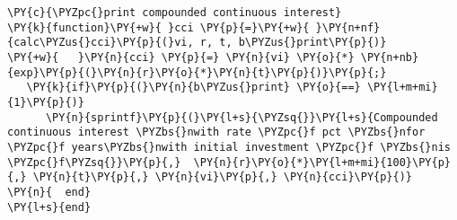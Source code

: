 \begin{Verbatim}[commandchars=\\\{\}]
\PY{c}{\PYZpc{}print compounded continuous interest}
\PY{k}{function}\PY{+w}{ }cci \PY{p}{=}\PY{+w}{ }\PY{n+nf}{calc\PYZus{}cci}\PY{p}{(}vi, r, t, b\PYZus{}print\PY{p}{)}
\PY{+w}{   }\PY{n}{cci} \PY{p}{=} \PY{n}{vi} \PY{o}{*} \PY{n+nb}{exp}\PY{p}{(}\PY{n}{r}\PY{o}{*}\PY{n}{t}\PY{p}{)}\PY{p}{;}
   \PY{k}{if}\PY{p}{(}\PY{n}{b\PYZus{}print} \PY{o}{==} \PY{l+m+mi}{1}\PY{p}{)}
      \PY{n}{sprintf}\PY{p}{(}\PY{l+s}{\PYZsq{}}\PY{l+s}{Compounded continuous interest \PYZbs{}nwith rate \PYZpc{}f pct \PYZbs{}nfor \PYZpc{}f years\PYZbs{}nwith initial investment \PYZpc{}f \PYZbs{}nis \PYZpc{}f\PYZsq{}}\PY{p}{,}  \PY{n}{r}\PY{o}{*}\PY{l+m+mi}{100}\PY{p}{,} \PY{n}{t}\PY{p}{,} \PY{n}{vi}\PY{p}{,} \PY{n}{cci}\PY{p}{)}
\PY{n}{  end}
\PY{l+s}{end}
\end{Verbatim}

